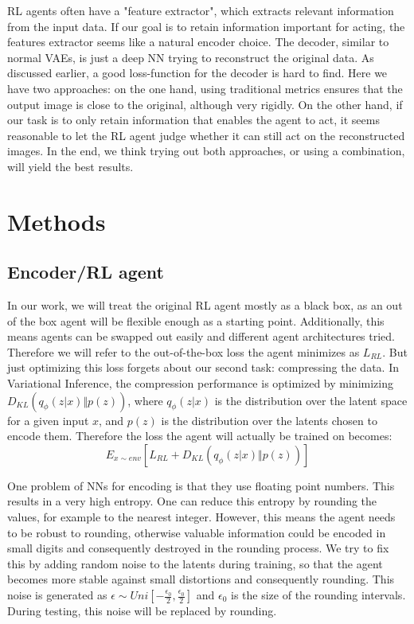 \documentclass[a4paper]{scrartcl}
\begin{document}
    RL agents often have a "feature extractor",
    which extracts relevant information from the input data. If our goal is to
    retain information important for acting, the features extractor
    seems like a natural encoder choice. The decoder, similar to
    normal VAEs, is just a deep NN trying to
    reconstruct the original data. As discussed earlier, a good
    loss-function for the decoder is hard to find. Here we have two
    approaches: on the one hand, using traditional metrics ensures that the
    output image is close to the original, although very rigidly. On the other hand, if our task is to only retain information that
    enables the agent to act, it seems reasonable to let the RL
    agent judge whether it can still act on the reconstructed images. In the end,
    we think trying out both approaches, or using a combination, will yield the
    best results.

\section{Methods}
    \subsection{Encoder/RL agent}
        In our work, we will treat the original RL agent mostly as a black box, as an out of the box
        agent will be flexible enough as a starting point. Additionally, this means
        agents can be swapped out easily and different agent architectures tried. Therefore we will refer to the out-of-the-box loss the agent
        minimizes as $L_{RL}$. But just optimizing this loss
        forgets about our second task: compressing the data. In
        Variational Inference, the compression performance is optimized by
        minimizing $D_{KL} (q_\phi (z\vert x) \Vert p(z))$, where $q_\phi
        (z\vert x)$ is the distribution over the latent space for a given input
        $x$, and $p(z)$ is the distribution over the latents chosen to encode them. Therefore the loss the agent will actually be trained on becomes:
        \begin{equation}
            E_{x \sim env} [L_{RL} + D_{KL} (q_\phi (z\vert x) \Vert p(z))]
        \end{equation}

        One problem of NNs for encoding is that they use
        floating point numbers. This results in a very high entropy. One can reduce this entropy by rounding
        the values, for example to the nearest integer. However, this means the
        agent needs to be robust to rounding, otherwise  valuable information could be encoded in small digits
        and consequently destroyed in the rounding process. We try to
        fix this by adding random noise to the latents during
        training, so that the agent becomes more stable against small
        distortions and consequently rounding. This noise is generated as $\epsilon \sim Uni[-\frac{\epsilon_0}{2}, \frac{\epsilon_0}{2}]$ and $\epsilon_0$ is the size of the rounding intervals. During testing, this
        noise will be replaced by rounding.
\end{document}
